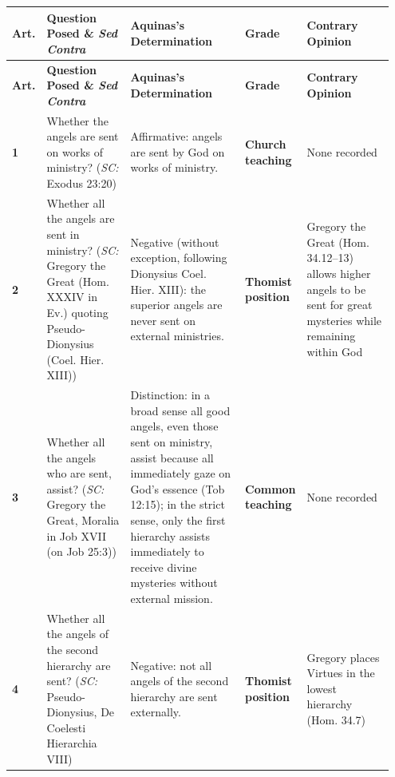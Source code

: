 {\scriptsize
\setlength{\tabcolsep}{2.5pt}
\renewcommand{\arraystretch}{1.15}
\begin{longtable}{>{\raggedright\arraybackslash}p{0.05\linewidth}>{\raggedright\arraybackslash}p{0.23\linewidth}>{\raggedright\arraybackslash}p{0.31\linewidth}>{\raggedright\arraybackslash}p{0.12\linewidth}>{\raggedright\arraybackslash}p{0.24\linewidth}}
\toprule
\textbf{Art.} & \textbf{Question Posed \& \emph{Sed Contra}} & \textbf{Aquinas's Determination} & \textbf{Grade} & \textbf{Contrary Opinion} \\
\midrule
\endfirsthead
\toprule
\textbf{Art.} & \textbf{Question Posed \& \emph{Sed Contra}} & \textbf{Aquinas's Determination} & \textbf{Grade} & \textbf{Contrary Opinion} \\
\midrule
\endhead
\bottomrule
\endfoot
\textbf{1} & Whether the angels are sent on works of ministry? (\emph{SC:} Exodus 23:20) & Affirmative: angels are sent by God on works of ministry. & \textbf{Church teaching} & None recorded \\
\addlinespace[1.5pt]
\textbf{2} & Whether all the angels are sent in ministry? (\emph{SC:} Gregory the Great (Hom. XXXIV in Ev.) quoting Pseudo-Dionysius (Coel. Hier. XIII)) & Negative (without exception, following Dionysius Coel. Hier. XIII): the superior angels are never sent on external ministries. & \textbf{Thomist position} & Gregory the Great (Hom. 34.12--13) allows higher angels to be sent for great mysteries while remaining within God \\
\addlinespace[1.5pt]
\textbf{3} & Whether all the angels who are sent, assist? (\emph{SC:} Gregory the Great, Moralia in Job XVII (on Job 25:3)) & Distinction: in a broad sense all good angels, even those sent on ministry, assist because all immediately gaze on God's essence (Tob 12:15); in the strict sense, only the first hierarchy assists immediately to receive divine mysteries without external mission. & \textbf{Common teaching} & None recorded \\
\addlinespace[1.5pt]
\textbf{4} & Whether all the angels of the second hierarchy are sent? (\emph{SC:} Pseudo-Dionysius, De Coelesti Hierarchia VIII) & Negative: not all angels of the second hierarchy are sent externally. & \textbf{Thomist position} & Gregory places Virtues in the lowest hierarchy (Hom. 34.7) \\
\end{longtable}
}

